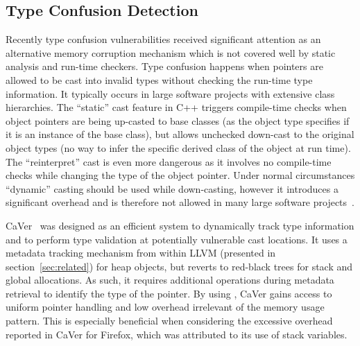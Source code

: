 \subsection{Type Confusion Detection}

Recently type confusion vulnerabilities received significant attention as an
alternative memory corruption mechanism which is not covered well by static analysis and run-time checkers. 
Type confusion happens when pointers are allowed to be cast into invalid types
without checking the run-time type information. It typically occurs in large software
projects with extensive class hierarchies. The ``static'' cast feature in C++ triggers compile-time
checks when object pointers are being up-casted to base classes
(as the object type specifies if it is an instance of the base class), but allows unchecked
down-cast to the original object types (no way to infer the specific derived class of the object at run time). 
The ``reinterpret'' cast is even more dangerous as it involves no compile-time checks
while changing the type of the object pointer. Under normal circumstances ``dynamic''
casting should be used while down-casting, however it introduces a significant overhead
and is therefore not allowed in many large software projects~\cite{lee2015type}.

%
CaVer~\cite{lee2015type} was designed as an efficient system to dynamically track type information
and to perform type validation at potentially vulnerable cast locations.
It uses a metadata tracking mechanism from within LLVM (presented in section~\ref{sec:related}) 
for heap objects, but reverts to red-black trees for stack and global allocations. As such,
it requires additional operations during metadata retrieval to identify the type of the pointer.
By using \projectname{}, CaVer gains access to uniform pointer handling and low overhead
irrelevant of the memory usage pattern. This is especially beneficial when considering the excessive
overhead reported in CaVer for Firefox, which was attributed to its use of stack variables.

